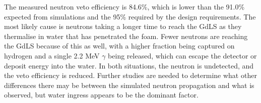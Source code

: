 \par
The measured neutron veto efficiency is 84.6\%, which is lower than the 91.0\% expected from simulations and the 95\% required by the design requirements.
The most likely cause is neutrons taking a longer time to reach the GdLS as they thermalise in water that has penetrated the foam.
Fewer neutrons are reaching the GdLS because of this as well, with a higher fraction being captured on hydrogen and a single 2.2 MeV $\gamma$ being released, which can escape the detector or deposit energy into the water.
In both situations, the neutron is undetected, and the veto efficiency is reduced.
Further studies are needed to determine what other differences there may be between the simulated neutron propagation and what is observed, but water ingress appears to be the dominant factor.



